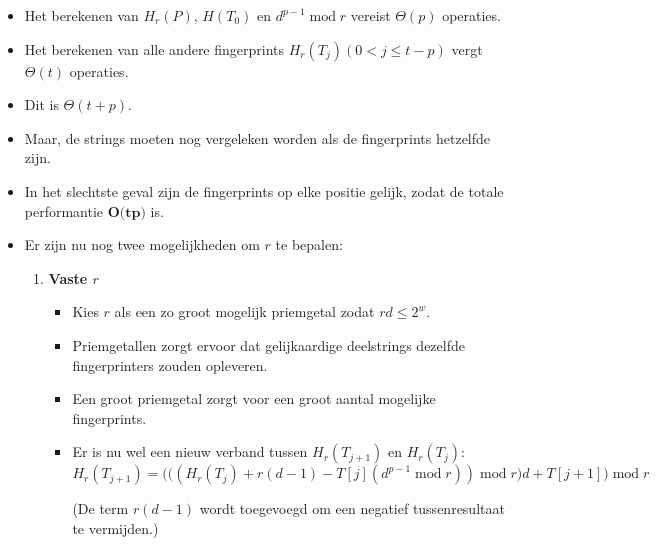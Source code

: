 \begin{itemize}
\begin{itemize}
        \item Het berekenen van $H_r(P)$, $H(T_0)$ en $d^{p-1}\;\mathrm{mod}\;r$ vereist $\Theta(p)$ operaties.
        \item Het berekenen van alle andere fingerprints $H_r(T_j) (0 < j \leq t - p)$ vergt $\Theta(t)$ operaties.
        \item Dit is $\Theta(t + p)$.
        \item Maar, de strings moeten nog vergeleken worden als de fingerprints hetzelfde zijn.
        \item In het slechtste geval zijn de fingerprints op elke positie gelijk, zodat de totale performantie $\textbf{O(tp)}$ is.
        \item Er zijn nu nog twee mogelijkheden om $r$ te bepalen:
        \begin{enumerate}
            \item \textbf{Vaste $r$}
            \begin{itemize}
                \item Kies $r$ als een zo groot mogelijk priemgetal zodat $rd \leq 2^w$.
                \item Priemgetallen zorgt ervoor dat gelijkaardige deelstrings dezelfde fingerprinters zouden opleveren.
                \item Een groot priemgetal zorgt voor een groot aantal mogelijke fingerprints.
                \item Er is nu wel een nieuw verband tussen $H_r(T_{j + 1})$ en $H_r(T_j)$:
                $$H_r(T_{j + 1}) = \bigg(\big((H_r(T_j) + r(d - 1) - T[j](d^{p-1}\;\mathrm{mod}\;r)) \;\mathrm{mod}\;r\big)d + T[j + 1] \bigg)\;\mathrm{mod}\;r$$
                
                (De term $r(d - 1)$ wordt toegevoegd om een negatief tussenresultaat te vermijden.)
            \end{itemize}



\end{enumerate}
\end{itemize}
\end{itemize}
